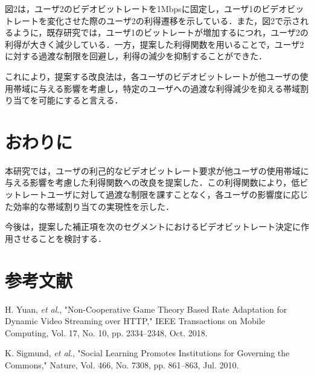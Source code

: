 \documentclass[twocolumn, a4paper]{ieicejsp}
\begin{document}
図2は，ユーザ2のビデオビットレートを1Mbpsに固定し，ユーザ1のビデオビットレートを変化させた際のユーザ2の利得遷移を示している．また，図2で示されるように，既存研究\cite{motomoto}では，ユーザ1のビットレートが増加するにつれ，ユーザ2の利得が大きく減少している．一方，提案した利得関数を用いることで，ユーザ2に対する過渡な制限を回避し，利得の減少を抑制することができた．

これにより，提案する改良法は，各ユーザのビデオビットレートが他ユーザの使用帯域に与える影響を考慮し，特定のユーザへの過渡な利得減少を抑える帯域割り当てを可能にすると言える．


\section{おわりに}
本研究では，ユーザの利己的なビデオビットレート要求が他ユーザの使用帯域に与える影響を考慮した利得関数への改良を提案した．この利得関数により，低ビットレートユーザに対して過渡な制限を課すことなく，各ユーザの影響度に応じた効率的な帯域割り当ての実現性を示した．

今後は，提案した補正項を次のセグメントにおけるビデオビットレート決定に作用させることを検討する．


\section*{参考文献}
\makeatletter
\renewcommand{\section}{\@ifstar{\@section}{}}
\newcommand{\@section}[1]{}
\makeatother
\begin{thebibliography}{99}
     H. Yuan, {\it{et al}}., "Non-Cooperative Game Theory Based Rate Adaptation for Dynamic Video Streaming over HTTP," 
IEEE Transactions on Mobile Computing, Vol. 17, No. 10, pp. 2334--2348, Oct. 2018.

K. Sigmund, {\it{et al}}., "Social Learning Promotes Institutions for Governing the Commons," 
Nature, Vol. 466, No. 7308, pp. 861--863, Jul. 2010. 


\end{thebibliography}
\end{document}
